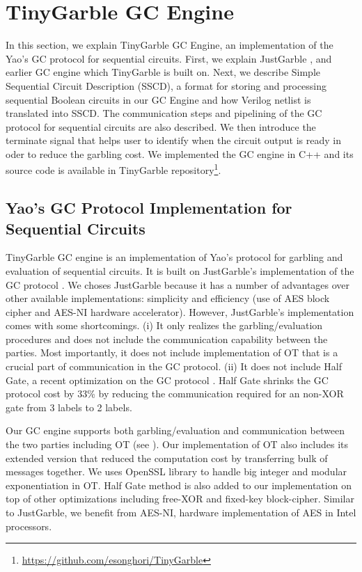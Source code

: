 \chapter{TinyGarble GC Engine}\label{sec:engine}
In this section, we explain TinyGarble GC Engine, an implementation of the Yao's GC protocol for sequential circuits.
First, we explain JustGarble \cite{bellare2013efficient}, and earlier GC engine which TinyGarble is built on. 
Next, we describe Simple Sequential Circuit Description (SSCD), a format for storing and processing sequential Boolean circuits in our GC Engine and how Verilog netlist is translated into SSCD.
The communication steps and pipelining of the GC protocol for sequential circuits are also described.
We then introduce the terminate signal that helps user to identify when the circuit output is ready in oder to reduce the garbling cost.
We implemented the GC engine in C++ and its source code is available in TinyGarble repository\footnote{\url{https://github.com/esonghori/TinyGarble}}.

\section{Yao's GC Protocol Implementation for Sequential Circuits} \label{ssec:engine-gc}
TinyGarble GC engine is an implementation of Yao's protocol for garbling and evaluation of sequential circuits.
It is built on JustGarble's implementation of the GC protocol \cite{bellare2013efficient}.
We choses JustGarble because it has a number of advantages over other available implementations: simplicity and efficiency (use of AES block cipher and AES-NI hardware accelerator).
However, JustGarble's implementation comes with some shortcomings.
(i) It only realizes the garbling/evaluation procedures and does not include the communication capability between the parties.
Most importantly, it does not include implementation of OT that is a crucial part of communication in the GC protocol.
(ii) It does not include Half Gate, a recent optimization on the GC protocol \cite{zahur2015two}.
Half Gate shrinks the GC protocol cost by 33\% by reducing the communication required for an non-XOR gate from 3 labels to 2 labels.

Our GC engine supports both garbling/evaluation and communication between the two parties including OT (see ).
Our implementation of OT also includes its extended version \cite{husted2013gpu} that reduced the computation cost by transferring bulk of messages together.
We uses OpenSSL library to handle big integer and modular exponentiation in OT.
Half Gate method is also added to our implementation on top of other optimizations including free-XOR and fixed-key block-cipher.
Similar to JustGarble, we benefit from AES-NI, hardware implementation of AES in Intel processors.

